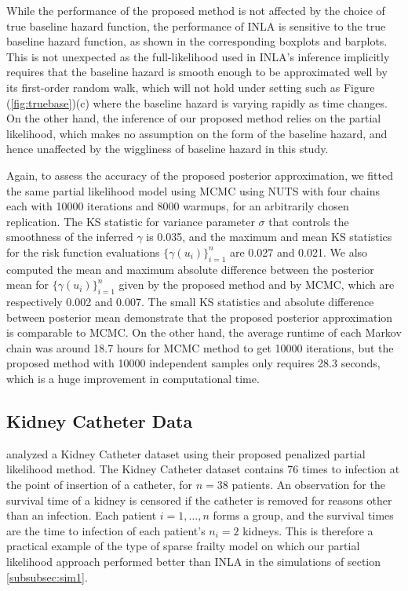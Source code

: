 \documentclass[ba]{imsart}
\begin{document}
While the performance of the proposed method is not affected by the choice of true baseline hazard function, the performance of INLA is sensitive to the true baseline hazard function, as shown in the corresponding boxplots and barplots. This is not unexpected as the full-likelihood used in INLA's inference implicitly requires that the baseline hazard is smooth enough to be approximated well by its first-order random walk, which will not hold under setting such as Figure (\ref{fig:truebase})(c) where the baseline hazard is varying rapidly as time changes. On the other hand, the inference of our proposed method relies on the partial likelihood, which makes no assumption on the form of the baseline hazard, and hence unaffected by the wiggliness of baseline hazard in this study. 

Again, to assess the accuracy of the proposed posterior approximation, we fitted the same partial likelihood model using MCMC using NUTS with four chains each with 10000 iterations and 8000 warmups, for an arbitrarily chosen replication. The KS statistic for variance parameter $\sigma$ that controls the smoothness of the inferred $\gamma$ is 0.035, and the maximum and mean KS statistics for the risk function evaluations $\{\gamma(u_i)\}_{i=1}^n$ are 0.027 and 0.021. We also computed the mean and maximum absolute difference between the posterior mean for $\{\gamma(u_i)\}_{i=1}^n$ given by the proposed method and by MCMC, which are respectively 0.002 and 0.007. The small KS statistics and absolute difference between posterior mean demonstrate that the proposed posterior approximation is comparable to MCMC. On the other hand, the average runtime of each Markov chain was around 18.7 hours for MCMC method to get 10000 iterations, but the proposed method with 10000 independent samples only requires 28.3 seconds, which is a huge improvement in computational time.

\subsection{Kidney Catheter Data}\label{subsec:kidney}

\cite{freqPL} analyzed a Kidney Catheter dataset using their proposed penalized partial likelihood method. The Kidney Catheter dataset contains 76 times to infection at the point of insertion of a catheter, for $n = 38$ patients. An observation for the survival time of a kidney is censored if the catheter is removed for reasons other than an infection.  Each patient $i=1,\ldots,n$ forms a group, and the survival times are the time to infection of each patient's $n_{i} = 2$ kidneys. This is therefore a practical example of the type of sparse frailty model on which our partial likelihood approach performed better than INLA in the simulations of section \ref{subsubsec:sim1}.
\end{document}
